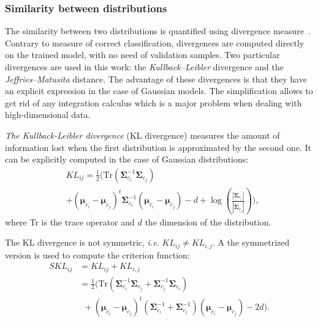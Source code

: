 \documentclass[journal,peerreview,onecolumn]{IEEEtran}
\begin{document}
        \subsubsection{Similarity between distributions}
        The similarity  between two distributions is  quantified using
        divergence  measure~\cite{opac-b1097517}. Contrary  to measure
        of correct  classification, divergences are  computed directly
        on the trained model, with no need of validation samples.  Two
        particular   divergences   are   used  in   this   work:   the
        \emph{Kullback–Leibler}        divergence       and        the
        \emph{Jeffries–Matusita}  distance.  The  advantage  of  these
        divergences is  that they have  an explicit expression  in the
        case of Gaussian models. The  simplification allows to get rid
        of  any integration  calculus which  is a  major problem  when
        dealing with high-dimensional data.

        \emph{The   Kullback-Leibler   divergence}   (KL   divergence)
        measures  the  amount  of  information  lost  when  the  first
        distribution     is     approximated     by     the     second
        one\cite{kullback1987letter}. It can be explicitly computed in
        the case of Gaussian distributions:
        \begin{align}
            &KL_{ij} = \frac{1}{2} \biggl( \text{Tr} (\boldsymbol{\Sigma}_{c_i}^{-1} \boldsymbol{\Sigma}_{c_j}) \nonumber \\
            & + (\boldsymbol{\mu}_{c_i} - \boldsymbol{\mu}_{c_j})^t \boldsymbol{\Sigma}_{c_i}^{-1} (\boldsymbol{\mu}_{c_i} - \boldsymbol{\mu}_{c_j}) - d + \log \left( \frac{|\boldsymbol{\Sigma}_{c_i}|}{|\boldsymbol{\Sigma}_{c_j}|} \right) \biggr),
        \end{align}
        where Tr is the trace operator and $d$ the dimension of the distribution.

        The    KL   divergence    is   not    symmetric,   \emph{i.e.}
        $KL_{ij} \ne KL_{i,j}$.  A the symmetrized version  is used to
        compute the criterion function:
        \begin{align}
          SKL_{ij} &=KL_{ij} + KL_{i,j} \nonumber \\
            &= \frac{1}{2} \biggl( \text{Tr} (\boldsymbol{\Sigma}_{c_i}^{-1} \boldsymbol{\Sigma}_{c_j} + \boldsymbol{\Sigma}_{c_j}^{-1} \boldsymbol{\Sigma}_{c_i}) \nonumber \\
            &~~+ (\boldsymbol{\mu}_{c_i} - \boldsymbol{\mu}_{c_j})^t (\boldsymbol{\Sigma}_{c_i}^{-1} + \boldsymbol{\Sigma}_{c_j}^{-1}) (\boldsymbol{\mu}_{c_i} - \boldsymbol{\mu}_{c_j}) - 2d \biggr).
        \end{align}
\end{document}
